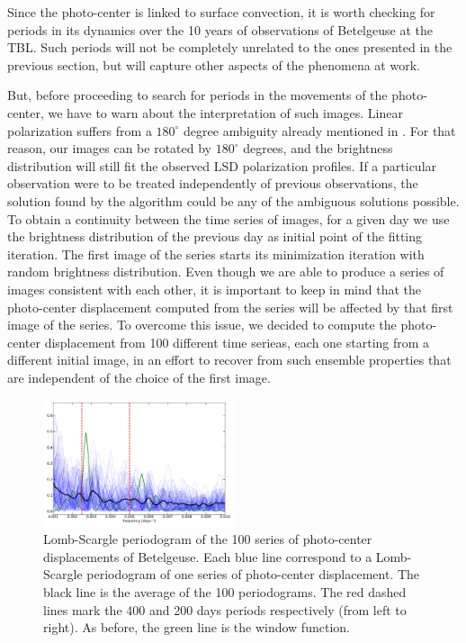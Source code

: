\documentclass{aa}
\begin{document}
Since the photo-center is linked to surface convection, it is worth checking for periods in its 
dynamics over the 10 years of observations of Betelgeuse at the TBL. Such periods will not 
be completely unrelated to the ones presented in the previous section, but will capture 
other aspects of the phenomena at work.

But, before proceeding to search for periods in the movements of the photo-center, we have to warn about the interpretation of such images. 
Linear polarization suffers from a $180 ^\circ$ degree ambiguity already mentioned in \cite{auriere_discovery_2016}. For that reason, our 
images can be rotated by $180^\circ$ degrees, and the brightness distribution will still fit the observed LSD polarization profiles. 
If a particular observation were to be treated independently of previous observations, the solution found by 
the algorithm could be any of the ambiguous solutions possible. To obtain a continuity 
between the time series of images, for a given day we use the brightness distribution of the previous day as initial point 
of the  fitting iteration. The first image of the series  starts its minimization iteration with 
random brightness distribution. 
Even though we are able to produce a series of images  consistent with each other, it is important 
to keep in mind that the photo-center displacement computed from the series 
will be affected by that first image of the series. 
To overcome this issue, we decided to compute
the photo-center displacement from 100 different time serieas, each one starting from a different initial image, in an effort to recover 
from such ensemble
properties that are independent of the choice of the first image. 

\begin{figure}[!h]
    \centering
    \includegraphics[width=0.5\textwidth]{Lomb-Scargle Photo-center.pdf}
    \caption{Lomb-Scargle periodogram of the 100 series of photo-center displacements of Betelgeuse. Each blue line correspond to a Lomb-Scargle periodogram of one series of photo-center
     displacement. The black line is the average of the 100 periodograms. The red dashed lines mark the 400 and 200 days periods respectively 
     (from left to right). As before, the green line is the window function.}
    \label{LS photocenter}
\end{figure}
\end{document}
